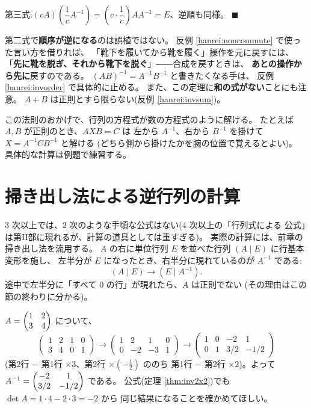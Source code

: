 第三式:$(cA)\left(\dfrac{1}{c}A^{-1}\right)
= \left(c \cdot \dfrac{1}{c}\right)AA^{-1} = E$、逆順も同様。 $\blacksquare$

\begin{chui}
第二式で\textbf{順序が逆になる}のは誤植ではない。
反例 \ref{hanrei:noncommute} で使った言い方を借りれば、
「靴下を履いてから靴を履く」操作を元に戻すには、
「\textbf{先に靴を脱ぎ、それから靴下を脱ぐ}」――合成を戻すときは、
\textbf{あとの操作から先に}戻すのである。
$(AB)^{-1} = A^{-1}B^{-1}$ と書きたくなる手は、
反例 \ref{hanrei:invorder} で具体的に止める。
また、この定理に\textbf{和の式がない}ことにも注意。
$A + B$ は正則とすら限らない(反例 \ref{hanrei:invsum})。
\end{chui}

この法則のおかげで、行列の方程式が数の方程式のように解ける。
たとえば $A, B$ が正則のとき、$AXB = C$ は
左から $A^{-1}$、右から $B^{-1}$ を掛けて $X = A^{-1}CB^{-1}$ と解ける
(どちら側から掛けたかを腕の位置で覚えるとよい)。
具体的な計算は例題で練習する。

\section{掃き出し法による逆行列の計算}

$3$ 次以上では、$2$ 次のような手頃な公式はない($4$ 次以上の「行列式による
公式」は第II部に現れるが、計算の道具としては重すぎる)。
実際の計算には、前章の掃き出し法を流用する。
$A$ の右に単位行列 $E$ を並べた行列 $(A \mid E)$ に行基本変形を施し、
左半分が $E$ になったとき、右半分に現れているのが $A^{-1}$ である:
\[
(A \mid E) \longrightarrow (E \mid A^{-1}).
\]
途中で左半分に「すべて $0$ の行」が現れたら、$A$ は正則でない
(その理由はこの節の終わりに分かる)。

\begin{rei}[掃き出しによる逆行列]\label{rei:inv-gauss}
$A = \begin{pmatrix}1 & 2 \\ 3 & 4\end{pmatrix}$ について、
\[
\left(\begin{array}{cc|cc}
1 & 2 & 1 & 0 \\
3 & 4 & 0 & 1
\end{array}\right)
\longrightarrow
\left(\begin{array}{cc|cc}
1 & 2 & 1 & 0 \\
0 & -2 & -3 & 1
\end{array}\right)
\longrightarrow
\left(\begin{array}{cc|cc}
1 & 0 & -2 & 1 \\
0 & 1 & 3/2 & -1/2
\end{array}\right)
\]
(第2行 $-$ 第1行 $\times 3$、第2行 $\times(-\frac{1}{2})$ ののち
第1行 $-$ 第2行 $\times 2$)。よって
$A^{-1} = \begin{pmatrix}-2 & 1 \\ 3/2 & -1/2\end{pmatrix}$ である。
公式(定理 \ref{thm:inv2x2})でも $\det A = 1 \cdot 4 - 2 \cdot 3 = -2$ から
同じ結果になることを確かめてほしい。
\end{rei}


